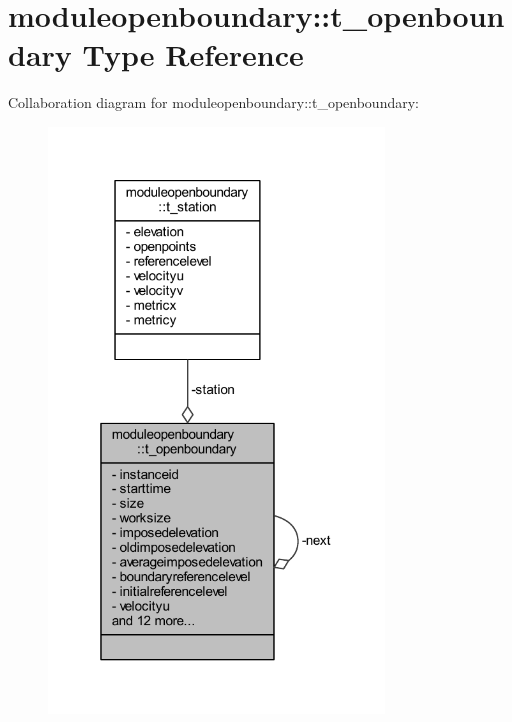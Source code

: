 \hypertarget{structmoduleopenboundary_1_1t__openboundary}{}\section{moduleopenboundary\+:\+:t\+\_\+openboundary Type Reference}
\label{structmoduleopenboundary_1_1t__openboundary}


Collaboration diagram for moduleopenboundary\+:\+:t\+\_\+openboundary\+:\nopagebreak
\begin{figure}[H]
\begin{center}
\leavevmode
\includegraphics[width=253pt]{structmoduleopenboundary_1_1t__openboundary__coll__graph}
\end{center}
\end{figure}

